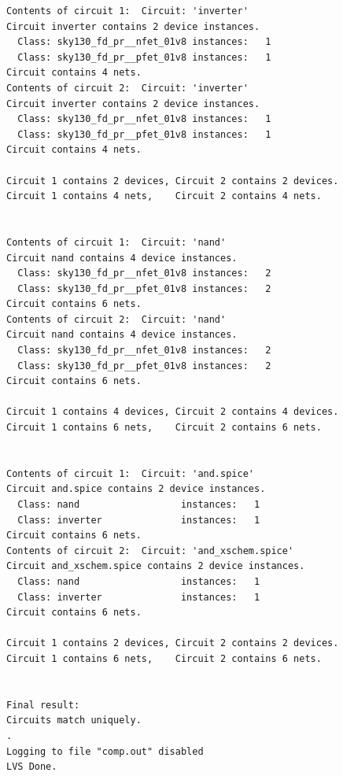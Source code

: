 \documentclass[11pt]{article}
\begin{document}
\begin{lstlisting}
Contents of circuit 1:  Circuit: 'inverter'
Circuit inverter contains 2 device instances.
  Class: sky130_fd_pr__nfet_01v8 instances:   1
  Class: sky130_fd_pr__pfet_01v8 instances:   1
Circuit contains 4 nets.
Contents of circuit 2:  Circuit: 'inverter'
Circuit inverter contains 2 device instances.
  Class: sky130_fd_pr__nfet_01v8 instances:   1
  Class: sky130_fd_pr__pfet_01v8 instances:   1
Circuit contains 4 nets.

Circuit 1 contains 2 devices, Circuit 2 contains 2 devices.
Circuit 1 contains 4 nets,    Circuit 2 contains 4 nets.


Contents of circuit 1:  Circuit: 'nand'
Circuit nand contains 4 device instances.
  Class: sky130_fd_pr__nfet_01v8 instances:   2
  Class: sky130_fd_pr__pfet_01v8 instances:   2
Circuit contains 6 nets.
Contents of circuit 2:  Circuit: 'nand'
Circuit nand contains 4 device instances.
  Class: sky130_fd_pr__nfet_01v8 instances:   2
  Class: sky130_fd_pr__pfet_01v8 instances:   2
Circuit contains 6 nets.

Circuit 1 contains 4 devices, Circuit 2 contains 4 devices.
Circuit 1 contains 6 nets,    Circuit 2 contains 6 nets.


Contents of circuit 1:  Circuit: 'and.spice'
Circuit and.spice contains 2 device instances.
  Class: nand                  instances:   1
  Class: inverter              instances:   1
Circuit contains 6 nets.
Contents of circuit 2:  Circuit: 'and_xschem.spice'
Circuit and_xschem.spice contains 2 device instances.
  Class: nand                  instances:   1
  Class: inverter              instances:   1
Circuit contains 6 nets.

Circuit 1 contains 2 devices, Circuit 2 contains 2 devices.
Circuit 1 contains 6 nets,    Circuit 2 contains 6 nets.


Final result: 
Circuits match uniquely.
.
Logging to file "comp.out" disabled
LVS Done.
\end{lstlisting}

\newpage
\end{document}
